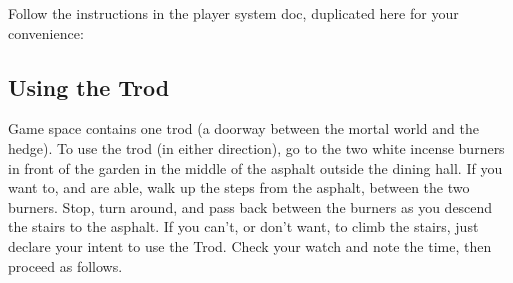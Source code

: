 \documentclass[green]{gl2018}
\begin{document}
\name{\gTrod{}}
\newcommand{\areastart}[1]{ \begin{huge}{\bf \#{#1}} \end{huge} \\}
\newenvironment{sect}[1]{\begin{minipage}{\textwidth}\areastart{#1}\\}{\end{minipage}\vspace{3in}}

Follow the instructions in the player system doc, duplicated here for your convenience:

\subsection*{Using the Trod}

Game space contains one trod (a doorway between the mortal world and the hedge). To use the trod (in either direction), go to the two white incense burners in front of the garden in the middle of the asphalt outside the dining hall. If you want to, and are able, walk up the steps from the asphalt, between the two burners. Stop, turn around, and pass back between the burners as you descend the stairs to the asphalt. If you can’t, or don’t want, to climb the stairs, just declare your intent to use the Trod. Check your watch and note the time, then proceed as follows.
\end{document}

